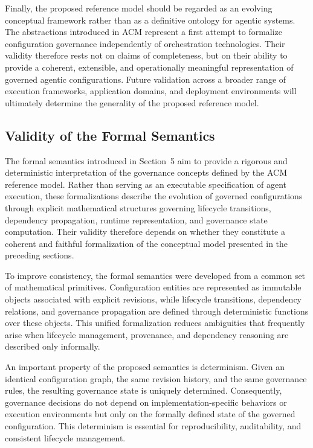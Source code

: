 \documentclass[10pt]{article}
\begin{document}
Finally, the proposed reference model should be regarded as an evolving conceptual framework rather than as a definitive ontology for agentic systems. The abstractions introduced in ACM represent a first attempt to formalize configuration governance independently of orchestration technologies. Their validity therefore rests not on claims of completeness, but on their ability to provide a coherent, extensible, and operationally meaningful representation of governed agentic configurations. Future validation across a broader range of execution frameworks, application domains, and deployment environments will ultimately determine the generality of the proposed reference model.

\subsection{Validity of the Formal Semantics}

The formal semantics introduced in Section~5 aim to provide a rigorous and deterministic interpretation of the governance concepts defined by the ACM reference model. Rather than serving as an executable specification of agent execution, these formalizations describe the evolution of governed configurations through explicit mathematical structures governing lifecycle transitions, dependency propagation, runtime representation, and governance state computation. Their validity therefore depends on whether they constitute a coherent and faithful formalization of the conceptual model presented in the preceding sections.

To improve consistency, the formal semantics were developed from a common set of mathematical primitives. Configuration entities are represented as immutable objects associated with explicit revisions, while lifecycle transitions, dependency relations, and governance propagation are defined through deterministic functions over these objects. This unified formalization reduces ambiguities that frequently arise when lifecycle management, provenance, and dependency reasoning are described only informally.

An important property of the proposed semantics is determinism. Given an identical configuration graph, the same revision history, and the same governance rules, the resulting governance state is uniquely determined. Consequently, governance decisions do not depend on implementation-specific behaviors or execution environments but only on the formally defined state of the governed configuration. This determinism is essential for reproducibility, auditability, and consistent lifecycle management.
\end{document}

